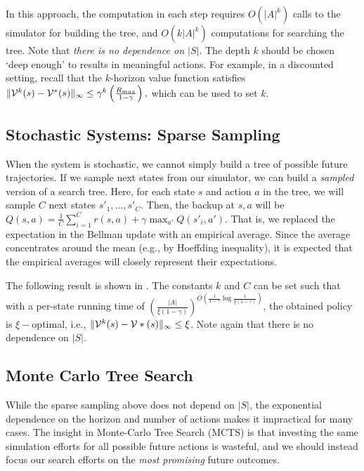 In this approach, the computation in each step requires $O(|A|^{k})$ calls to the simulator for building the tree, and $O(k|A|^{k})$ computations for searching the tree. Note that \emph{there is no dependence on $|S|$}. The depth $k$ should be chosen `deep enough' to results in meaningful actions. For example, in a discounted setting, recall that the $k$-horizon value function satisfies 
$\|\mathcal{V}^{k}(s)-\mathcal{V}^{*}(s)\|_\infty \leq \gamma^k\left( \frac{R_{max}}{1-\gamma}\right),$ which can be used to set $k$. 

\subsection{Stochastic Systems: Sparse Sampling}
When the system is stochastic, we cannot simply build a tree of possible future trajectories. If we sample next states from our simulator, we can build a \emph{sampled} version of a search tree. Here, for each state $s$ and action $a$ in the tree, we will sample $C$ next states $s'_1,\dots,s'_C$. Then, the backup at $s,a$ will be $Q(s,a) = \frac{1}{C}\sum_{i=1}^C r(s,a) + \gamma \max_{a'} Q(s'_i,a')$.
That is, we replaced the expectation in the Bellman update with an empirical average. Since the average concentrates around the mean (e.g., by Hoeffding inequality), it is expected that the empirical averages will closely represent their expectations.

The following result is shown in \cite{kearns2002sparse}. The constants $k$ and $C$ can be set such that with a per-state running time of $(\frac{|A|}{\xi (1-\gamma)})^{O\left(\frac{1}{1-\gamma}\log \frac{1}{\xi (1-\gamma)}\right)}$, the obtained policy is $\xi-$optimal, i.e., $\|\mathcal{V}^k(s)-\mathcal{V}*(s)\|_\infty \leq \xi$. Note again that there is no dependence on $|S|$.

\subsection{Monte Carlo Tree Search}
While the sparse sampling above does not depend on $|S|$, the exponential dependence on the horizon and number of actions makes it impractical for many cases. The insight in Monte-Carlo Tree Search (MCTS) is that investing the same simulation efforts for all possible future actions is wasteful, and we should instead focus our search efforts on the \emph{most promising} future outcomes.

